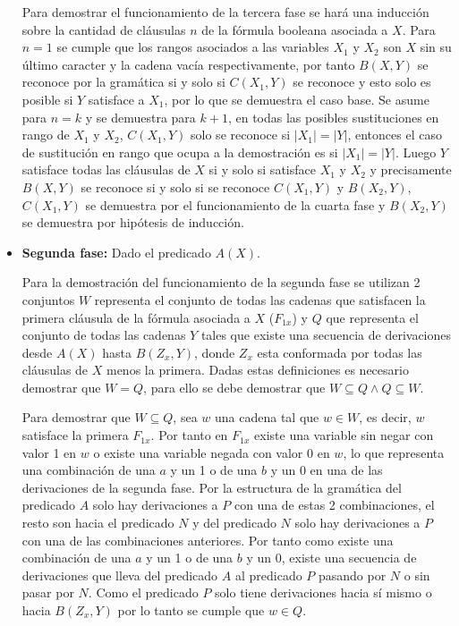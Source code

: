 \documentclass[12pt]{article}
\begin{document}
\begin{itemize}
          Para demostrar el funcionamiento de la tercera fase se hará una inducción sobre la cantidad de cláusulas $n$ de
          la fórmula booleana asociada a $X$. Para $n=1$ se cumple que los
          rangos asociados a las variables $X_1$ y $X_2$ son $X$ sin su último caracter y la cadena vacía respectivamente, por
          tanto $B(X,Y)$ se reconoce por la gramática si y solo si $C(X_1,Y)$ se reconoce y esto solo es posible si $Y$ satisface a
          $X_1$, por lo que se demuestra el caso base. Se asume para $n=k$ y se demuestra para $k+1$, en todas las posibles sustituciones en
          rango de $X_1$ y $X_2$, $C(X_1,Y)$ solo se reconoce si $|X_1|=|Y|$, entonces el caso de sustitución en rango que ocupa a la demostración
          es si $|X_1|=|Y|$. Luego $Y$ satisface todas las cláusulas de $X$ si y solo si satisface $X_1$ y $X_2$ y precisamente
          $B(X,Y)$ se reconoce si y solo si se reconoce $C(X_1,Y)$ y $B(X_2,Y)$, $C(X_1,Y)$ se demuestra por el funcionamiento de la
          cuarta fase y  $B(X_2,Y)$ se demuestra por hipótesis de inducción.

    \item \textbf{Segunda fase:} Dado el predicado $A(X)$.

          Para la demostración del funcionamiento de la segunda fase se utilizan 2 conjuntos $W$ representa el conjunto de todas
          las cadenas que satisfacen la primera cláusula de la fórmula asociada a $X$ ($F_{1x}$) y $Q$ que representa el conjunto de todas las cadenas $Y$
          tales que existe una secuencia de derivaciones desde $A(X)$ hasta $B(Z_x,Y)$, donde $Z_x$ esta
          conformada por todas las cláusulas de $X$ menos la primera. Dadas estas definiciones es necesario
          demostrar que $W=Q$, para ello se debe demostrar que $W\subseteq Q \wedge Q\subseteq W$.

          Para demostrar que $W\subseteq Q$, sea $w$ una cadena tal que $w\in W$, es decir, $w$ satisface la primera $F_{1x}$. Por tanto en
          $F_{1x}$ existe una variable sin negar con valor 1 en $w$ o existe una variable negada con valor 0 en $w$, lo que representa
          una combinación de una $a$ y un 1 o de una $b$ y un 0 en una de las derivaciones de la segunda fase. Por la estructura
          de la gramática del predicado $A$ solo hay derivaciones a $P$ con una de estas 2 combinaciones, el resto son hacia
          el predicado $N$ y del predicado $N$ solo hay derivaciones a $P$ con una de las combinaciones anteriores. Por tanto como
          existe una combinación de una $a$ y un 1 o de una $b$ y un 0, existe una secuencia de derivaciones que lleva del predicado $A$ al predicado $P$
          pasando por $N$ o sin pasar por $N$. Como el predicado $P$ solo tiene derivaciones hacia sí mismo o hacia $B(Z_x,Y)$ por lo tanto se cumple
          que $w\in Q$.


\end{itemize}
\end{document}
